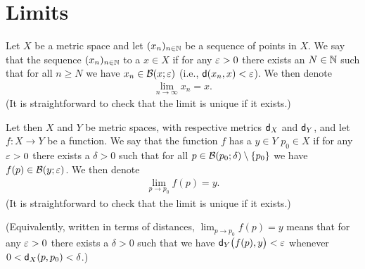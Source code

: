 \section{Limits}

\begin{definition}[Limit]
  \label{def:limit}
  Let $X$ be a metric space and
  let $(x_n)_{n \in \mathbb{N}}$ be a sequence of points in $X$.
  We say that the sequence $(x_n)_{n \in \mathbb{N}}$ 
  to a  $x \in X$
  if for any $\varepsilon > 0$ there exists an $N \in \mathbb{N}$ such that
  for all $n \ge N$ we have $x_n \in \mathcal{B}(x; \varepsilon)$
  (i.e., $\mathsf{d}(x_n,x) < \varepsilon$).
  We then denote
  \begin{align*}
    \lim_{n \to \infty} x_n = x .
  \end{align*}
  (It is straightforward to check that the limit is
  unique if it exists.)

  Let then $X$ and $Y$ be metric spaces, with respective metrics
  $\mathsf{d}_X$ and $\mathsf{d}_Y$, and
  let $f \colon X \to Y$ be a function.
  We say that the function $f$ has a  $y \in Y$
   $p_0 \in X$
  if for any $\varepsilon > 0$ there exists a $\delta > 0$ such that
  for all $p \in \mathcal{B}(p_0; \delta) \setminus \left\{ p_0 \right\}$
  we have $f(p) \in \mathcal{B}(y; \varepsilon)$.
  We then denote
  \begin{align*}
    \lim_{p \to p_0} f(p) = y .
  \end{align*}
  (It is straightforward to check that the limit is
  unique if it exists.)

  (Equivalently, written in terms of distances,
  $\lim_{p \to p_0} f(p) = y$ means that
  for any $\varepsilon > 0$ there exists a $\delta > 0$ such that
  we have $\mathsf{d}_Y \big( f(p), y \big) < \varepsilon$ whenever
  $0 < \mathsf{d}_X (p,p_0) < \delta$.)
\end{definition}

